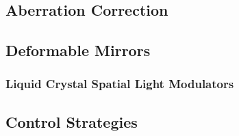 \subsection{Aberration Correction}
\label{sec:AberrationCorrection}

\subsection{Deformable Mirrors}
\label{sec:DeformableMirror}

\subsubsection{Liquid Crystal Spatial Light Modulators}
\label{sec:LiquidCrystalSpatialLightModulators}

\subsection{Control Strategies}
\label{sec:ControlStrategies}

\clearpage